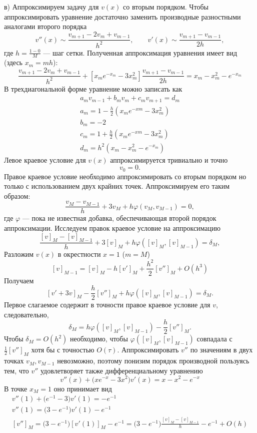 \documentclass[12pt]{article}
\begin{document}
в) Аппроксимируем задачу для $v(x)$ со вторым порядком. Чтобы аппроксимировать уравнение достаточно заменить производные разностными аналогами второго порядка
\[
v''(x) \sim \frac{v_{m+1} - 2v_m + v_{m-1}}{h^2}, \qquad v'(x) \sim \frac{v_{m+1} - v_{m-1}}{2h},
\]
где $h = \frac{1 - 0}{M}$ --- шаг сетки.
Полученная аппроксимация уравнения имеет вид (здесь $x_m = m h$):
\[
\frac{v_{m+1} - 2v_m + v_{m-1}}{h^2}  + [x_m e^{-x_m} - 3x_m^2] \frac{v_{m+1} - v_{m-1}}{2h}
= x_m - x_m^2 - e^{-x_m}
\]
В трехдиагональной форме уравнение можно записать как
\begin{gather*}
a_{m} v_{m-1} + b_m v_m + c_m v_{m+1} = d_{m}\\
a_{m} = 1 - \frac{h}{2} (x_m e^{-xm}-3x_m^2)\\
b_{m} = -2\\
c_{m} = 1 + \frac{h}{2} (x_m e^{-xm}-3x_m^2)\\
d_{m} = h^2 (x_m - x_m^2 - e^{-x_m})
\end{gather*}
Левое краевое условие для $v(x)$ аппроксимируется тривиально и точно
\[
v_0 = 0.
\]
Правое краевое условие необходимо аппроксимировать со вторым порядком но только с использованием двух крайних точек. Аппроксимируем его таким образом:
\[
\frac{v_M - v_{M-1}}{h} + 3v_M + h\varphi(v_M, v_{M-1}) = 0,
\]
где $\varphi$ --- пока не известная добавка, обеспечивающая второй порядок аппроксимации. Исследуем правок краевое условие на аппроксимацию
\[
\frac{[v]_M - [v]_{M-1}}{h} + 3[v]_M + h\varphi([v]_M, [v]_{M-1}) = \delta_M,
\]
Разложим $v(x)$ в окрестности $x = 1$ ($m = M$)
\[
[v]_{M-1} = [v]_M - h [v']_M + \frac{h^2}{2}[v'']_M + O(h^3)
\]
Получаем
\[
[v' + 3v]_M - \frac{h}{2}[v'']_M + h\varphi([v]_M, [v]_{M-1}) = \delta_M.
\]
Первое слагаемое содержит в точности правое краевое условие для $v$, следовательно,
\[
\delta_M = h\varphi([v]_M, [v]_{M-1}) - \frac{h}{2}[v'']_M.
\]
Чтобы $\delta_M = O(h^2)$ необходимо, чтобы $\varphi([v]_M, [v]_{M-1})$ совпадала с $\frac{1}{2}[v'']_M$  хотя бы с точностью $O(\tau)$. Аппроксимировать $v''$ по значениям в двух точках $v_M, v_{M-1}$ невозможно, поэтому понизим порядок производной пользуясь тем, что $v''$ удовлетворяет также дифференциальному уравнению
\[
v''(x) + \big(xe^{-x} - 3 x^2\big) v'(x)  = x - x^2 - e^{-x}
\]
В точке $x_M = 1$ оно принимает вид
\begin{gather*}
v''(1) + \big(e^{-1} - 3\big) v'(1)  = -e^{-1}\\
v''(1) = \big(3 - e^{-1}\big) v'(1) -e^{-1}\\
[v'']_M = \big(3 - e^{-1}\big) [v'(1)]_M -e^{-1} = 
\big(3 - e^{-1}\big) \frac{[v]_M - [v]_{M-1}}{h} -e^{-1} + O(h)
\end{gather*}
\end{document}

